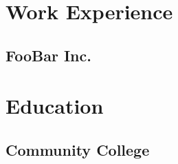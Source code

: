 \documentclass{customcv}
\begin{document}
\section{Work Experience}
\subsection{FooBar Inc.}
\section{Education}
\subsection{Community College}
\end{document}
